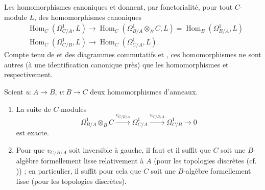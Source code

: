 \begin{env}[20.5.6]
\label{0.20.5.6-fr}
Les homomorphismes canoniques  et
 donnent, par fonctorialité, pour tout $C$-module $L$,
des homomorphismes canoniques
\begin{align}
\tag{20.5.6.1}
\label{0.20.5.6.1-fr}
  &\operatorname{Hom}_C(\Omega^1_{C/A},L)
  \to\operatorname{Hom}_C(\Omega^1_{B/A}\otimes_B C,L)
  =\operatorname{Hom}_B(\Omega^1_{B/A},L) \\
\tag{20.5.6.2}
\label{0.20.5.6.2-fr}
  &\operatorname{Hom}_C(\Omega^1_{C/B},L)
  \to\operatorname{Hom}_C(\Omega^1_{C/A},L).
\end{align}
Compte tenu de  et des diagrammes commutatifs
 et , ces homomorphismes ne sont
autres (à une identification canonique près) que les homomorphismes
 et  respectivement.
\end{env}

\begin{theorem}[20.5.7]
\label{0.20.5.7-fr}
Soient $u:A\to B$, $v:B\to C$ deux homomorphismes d'anneaux.
\begin{enumerate}
  \item[\rm(i)] La suite de $C$-modules
\begin{equation}
\tag{20.5.7.1}
\label{0.20.5.7.1-fr}
  \Omega^1_{B/A}\otimes_B C
  \xrightarrow{v_{C/B/A}}\Omega^1_{C/A}
  \xrightarrow{u_{C/B/A}}\Omega^1_{C/B}\to0
\end{equation}
est exacte.
  \item[\rm(ii)] Pour que $v_{C/B/A}$ soit inversible à gauche, il faut et
  il suffit que $C$ soit une $B$-algèbre formellement lisse relativement à
  $A$ (pour les topologies discrètes (cf. )) ; en
  particulier, il suffit pour cela que $C$ soit une $B$-algèbre formellement
  lisse (pour les topologies discrètes).
\end{enumerate}
\end{theorem}

